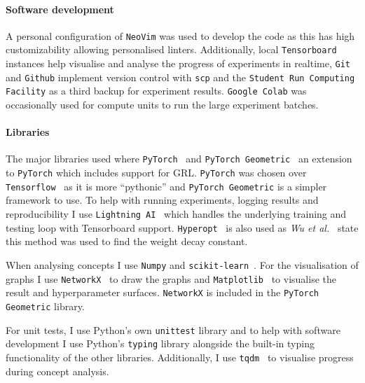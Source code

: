 \paragraph{Software development}

A personal configuration of \texttt{NeoVim} was used to develop the code as this has high customizability allowing personalised linters.
Additionally, local \texttt{Tensorboard}~\cite{tensorflow2015-whitepaper} instances help visualise and analyse the progress of experiments in realtime, \texttt{Git} and \texttt{Github} implement version control with \texttt{scp} and the \texttt{Student Run Computing Facility} as a third backup for experiment results.
\texttt{Google Colab} was occasionally used for compute units to run the large experiment batches.

\paragraph{Libraries}
\label{sec:libraries}

The major libraries used where \texttt{PyTorch}~\cite{paszke2019pytorch} and \texttt{PyTorch Geometric}~\cite{Fey/Lenssen/2019} an extension to \texttt{PyTorch} which includes support for GRL.
\texttt{PyTorch} was chosen over \texttt{Tensorflow}~\cite{tensorflow2015-whitepaper} as it is more ``pythonic'' and \texttt{PyTorch Geometric} is a simpler framework to use.
To help with running experiments, logging results and reproducibility I use \texttt{Lightning AI}~\cite{Falcon_PyTorch_Lightning_2019} which handles the underlying training and testing loop with Tensorboard support.
\texttt{Hyperopt}~\cite{bergstra2013making} is also used as \textit{Wu et al.}~\cite{wu2019simplifying} state this method was used to find the weight decay constant.

When analysing concepts I use \texttt{Numpy} and \texttt{scikit-learn}~\cite{scikit-learn}. For the visualisation of graphs I use \texttt{NetworkX}~\cite{SciPyProceedings_11} to draw the graphs and \texttt{Matplotlib}~\cite{Hunter:2007} to visualise the result and hyperparameter surfaces. \texttt{NetworkX} is included in the \texttt{PyTorch Geometric} library.

For unit tests, I use Python's own \texttt{unittest} library and to help with software development I use Python's \texttt{typing} library alongside the built-in typing functionality of the other libraries. Additionally, I use \texttt{tqdm}~\cite{casper_da_costa_luis_2023_7697295} to visualise progress during concept analysis.

